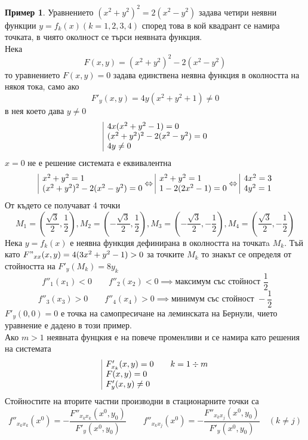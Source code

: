 \documentclass[a4paper,fleqn,12pt]{article}
\theoremstyle{definition}
\newtheorem{example}{Пример}[subsection]
\begin{document}
\begin{example}
Уравнението $(x^2 + y^2)^2 = 2(x^2 - y^2)$ задава четири неявни функции $y = f_k(x) (k = 1,2,3,4)$ според това в кой квадрант се намира точката, в чиято околност се търси неявната функция.\\
Нека $$F(x,y) = (x^2 + y^2)^2 - 2(x^2 - y^2)$$ то уравнението $F(x,y) = 0$ задава единствена неявна функция в околността на някоя тока, само ако $$F'_y(x,y) = 4y(x^2 + y^2 +1) \neq 0$$ в нея което дава $y \neq 0$
$$
\begin{array}{|l@{}}
4x (x^2 + y^2 - 1) = 0 \\ 
(x^2 + y^2)^2 - 2(x^2 - y^2) = 0 \\ 
4y \neq 0
\end{array}$$
$ x= 0$ не е решение системата е еквивалентна 
$$
\begin{array}{|l@{}}
x^2 + y^2 = 1 \\ 
(x^2 + y^2)^2 - 2(x^2 - y^2) = 0 
\end{array} \Leftrightarrow
\begin{array}{|l@{}}
x^2 + y^2 = 1 \\ 
1 - 2(2x^2 -1) = 0 
\end{array}\Leftrightarrow
\begin{array}{|l@{}}
4x^2 = 3 \\ 
4y^2 = 1 
\end{array}$$
От където се получават 4 точки 
$$M_1 = \left( \dfrac{\sqrt{3}}{2}, \dfrac{1}{2}\right), M_2 = \left( -\dfrac{\sqrt{3}}{2}, \dfrac{1}{2}\right), M_3 = \left(- \dfrac{\sqrt{3}}{2}, -\dfrac{1}{2}\right), M_4 = \left(\dfrac{\sqrt{3}}{2}, -\dfrac{1}{2}\right)$$
Нека $y = f_k(x)$ е неявна функция дефинирана в околността на точкатa $M_k$. Тъй като $F"_{xx} (x,y) = 4(3x^2 + y^2 - 1) >0 $ за точките $M_k$ то знакът се определя от стойността на $F'_y(M_k) = 8y_k$
$$f''_1(x_1) <0 \qquad f''_2(x_2) < 0 \implies \text{максимум със стойност } \dfrac{1}{2}$$
$$f''_3(x_3) >0 \qquad f''_4(x_4) > 0 \implies \text{минимум със стойност } - \dfrac{1}{2}$$
$F'_y(0,0) = 0$ е точка на самопресичане на леминската на Бернули, чието уравнение е дадено в този пример.\\
Ако $m > 1$ неявната фунцкия е на повече променливи и се намира като решения на системата 
$$\begin{array}{|l@{}}
F'_{x_k}(x,y) = 0 \qquad k = 1 \div m\\ 
F (x,y) = 0 \\ 
F'_y(x,y) \neq 0
\end{array}$$
Стойностите на вторите частни производни в стационарните точки са
$$f''_{x_k x_k}(x^0) = - \dfrac{F''_{x_k x_k}(x^0,y_0)}{F'_y(x^0,y_0)} \qquad f''_{x_k x_j}(x^0) = - \dfrac{F''_{x_k x_j}(x^0,y_0)}{F'_y(x^0,y_0)}\quad (k \neq j)$$
\end{example}
\end{document}
